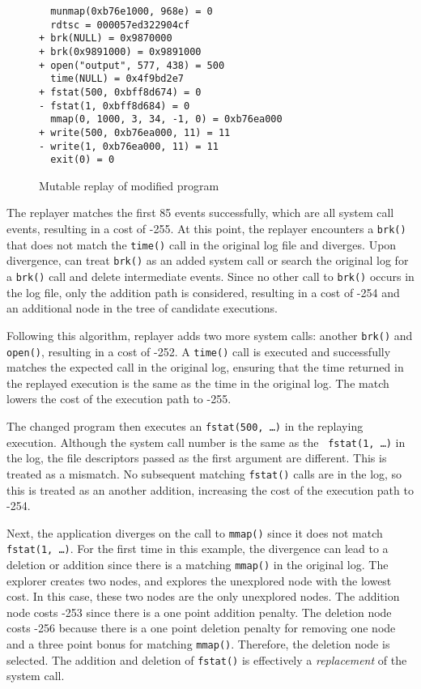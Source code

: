 \begin{figure}
\begin{center}
\begin{footnotesize}
\begin{verbatim}
  munmap(0xb76e1000, 968e) = 0
  rdtsc = 000057ed322904cf
+ brk(NULL) = 0x9870000
+ brk(0x9891000) = 0x9891000
+ open("output", 577, 438) = 500
  time(NULL) = 0x4f9bd2e7
+ fstat(500, 0xbff8d674) = 0
- fstat(1, 0xbff8d684) = 0
  mmap(0, 1000, 3, 34, -1, 0) = 0xb76ea000
+ write(500, 0xb76ea000, 11) = 11
- write(1, 0xb76ea000, 11) = 11
  exit(0) = 0
\end{verbatim}
\end{footnotesize}
\end{center}
\caption{Mutable replay of modified program}
\label{fig:diff}
\end{figure}

The replayer matches the first 85 events successfully,
which are all system call events, resulting in a cost of -255.
At this point, the replayer encounters a {\tt brk()}
that does not match the {\tt time()} call in the original log
file and diverges. Upon divergence, {\dora} can treat {\tt brk()}
as an added system call or search the original log for a {\tt brk()} call and
delete intermediate events. Since no other call to {\tt brk()} occurs in the log
file, only the addition path is considered, resulting in a cost of -254 and an
additional node in the tree of candidate executions.

Following this algorithm, replayer adds two more system calls:
another {\tt brk()} and {\tt open()}, resulting in a cost of
-252.
A {\tt time()} call is executed and successfully
matches the expected call in the original log, ensuring that the time returned
in the replayed execution is the same as the time in the original log. The match
lowers the cost of the execution path to -255.

The changed program then executes an {\tt fstat(500, \ldots)} in the
replaying execution.  Although the system call number is the same as the {\tt
fstat(1, \ldots)} in the log, the file
descriptors passed as the first argument are different.  This is treated as a
mismatch.  No
subsequent matching {\tt fstat()} calls are in the log, so this is 
treated as an another addition, increasing the cost of the execution path to -254.

Next, the application diverges on the call to {\tt mmap()}
since it does not match {\tt fstat(1, \ldots)}. For the
first time in this example, the divergence can lead to a deletion or addition
since
there is a matching {\tt mmap()} in the original log. The explorer creates two
nodes, and explores the unexplored node with the lowest cost. In this case,
these two nodes are the only unexplored nodes. The
addition node costs -253 since there is a one point addition penalty. The deletion
node costs -256 because there is a one point deletion penalty for removing one
node and a three point bonus for matching {\tt mmap()}. Therefore, the deletion
node is selected. The addition and deletion of {\tt fstat()} is effectively a
\emph{replacement} of the system call.

